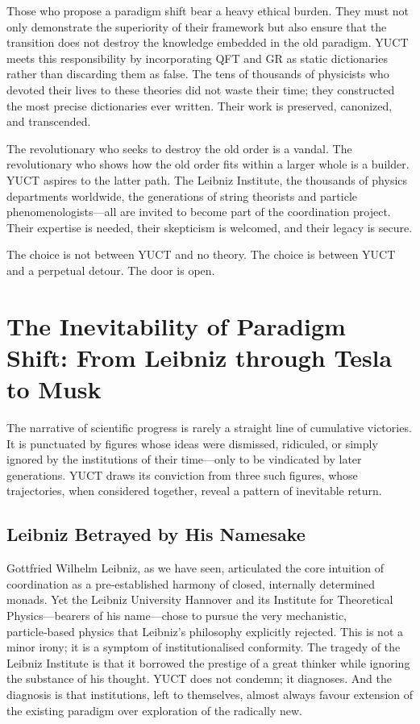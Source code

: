 \documentclass[12pt,a4paper]{article}
\begin{document}
	Those who propose a paradigm shift bear a heavy ethical burden. They must not only demonstrate the superiority of their framework but also ensure that the transition does not destroy the knowledge embedded in the old paradigm. YUCT meets this responsibility by incorporating QFT and GR as static dictionaries rather than discarding them as false. The tens of thousands of physicists who devoted their lives to these theories did not waste their time; they constructed the most precise dictionaries ever written. Their work is preserved, canonized, and transcended.
	
	The revolutionary who seeks to destroy the old order is a vandal. The revolutionary who shows how the old order fits within a larger whole is a builder. YUCT aspires to the latter path. The Leibniz Institute, the thousands of physics departments worldwide, the generations of string theorists and particle phenomenologists—all are invited to become part of the coordination project. Their expertise is needed, their skepticism is welcomed, and their legacy is secure.
	
	The choice is not between YUCT and no theory. The choice is between YUCT and a perpetual detour. The door is open.
	
	\section{The Inevitability of Paradigm Shift: From Leibniz through Tesla to Musk}
	
	The narrative of scientific progress is rarely a straight line of cumulative victories. It is punctuated by figures whose ideas were dismissed, ridiculed, or simply ignored by the institutions of their time—only to be vindicated by later generations. YUCT draws its conviction from three such figures, whose trajectories, when considered together, reveal a pattern of inevitable return.
	
	\subsection{Leibniz Betrayed by His Namesake}
	
	Gottfried Wilhelm Leibniz, as we have seen, articulated the core intuition of coordination as a pre‑established harmony of closed, internally determined monads. Yet the Leibniz University Hannover and its Institute for Theoretical Physics—bearers of his name—chose to pursue the very mechanistic, particle‑based physics that Leibniz’s philosophy explicitly rejected. This is not a minor irony; it is a symptom of institutionalised conformity. The tragedy of the Leibniz Institute is that it borrowed the prestige of a great thinker while ignoring the substance of his thought. YUCT does not condemn; it diagnoses. And the diagnosis is that institutions, left to themselves, almost always favour extension of the existing paradigm over exploration of the radically new.
	
\end{document}
